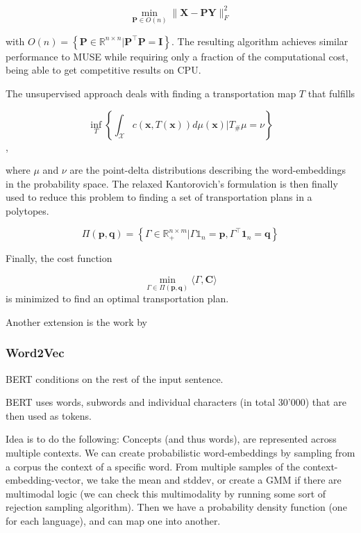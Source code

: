\documentclass[a4paper,12pt,twoside,openright]{report}
\begin{document}
\begin{equation}
\min _{\mathbf{P} \in O(n)}\|\mathbf{X}-\mathbf{P} \mathbf{Y}\|_{F}^{2}
\end{equation}

with $O(n)=\left\{\mathbf{P} \in \mathbb{R}^{n \times n} | \mathbf{P}^{\top} \mathbf{P}=\mathbf{I}\right\}$.
The resulting algorithm achieves similar performance to MUSE while requiring only a fraction of the computational cost, being able to get competitive results on CPU.

The unsupervised approach deals with finding a transportation map $T$ that fulfills

\begin{equation}
\inf _{T}\left\{\int_{\mathcal{X}} c(\mathbf{x}, T(\mathbf{x})) d \mu(\mathbf{x}) | T_{\#} \mu=\nu\right\}
\end{equation},

where $\mu$ and $\nu$ are the point-delta distributions describing the word-embeddings in the probability space.
The relaxed Kantorovich's formulation is then finally used to reduce this problem to finding a set of transportation plans in a polytopes.

$$
\Pi(\mathbf{p}, \mathbf{q})=\left\{\Gamma \in \mathbb{R}_{+}^{n \times m} | \Gamma \mathbb{1}_{n}=\mathbf{p}, \Gamma^{\top} \mathbf{1}_{n}=\mathbf{q}\right\}
$$

Finally, the cost function

$$
\min _{\Gamma \in \Pi(\mathbf{p}, \mathbf{q})}\langle\Gamma, \mathbf{C}\rangle
$$
is minimized to find an optimal transportation plan.


Another extension is the work by  


\newpage
\subsubsection{Word2Vec}

BERT conditions on the rest of the input sentence.

BERT uses words, subwords and individual characters (in total 30'000) that are then used as tokens.

Idea is to do the following:
Concepts (and thus words), are represented across multiple contexts.
We can create probabilistic word-embeddings by sampling from a corpus the context of a specific word.
From multiple samples of the context-embedding-vector, we take the mean and stddev, or create a GMM if there are multimodal logic (we can check this multimodality by running some sort of rejection sampling algorithm).
Then we have a probability density function (one for each language), and can map one into another.
\end{document}
